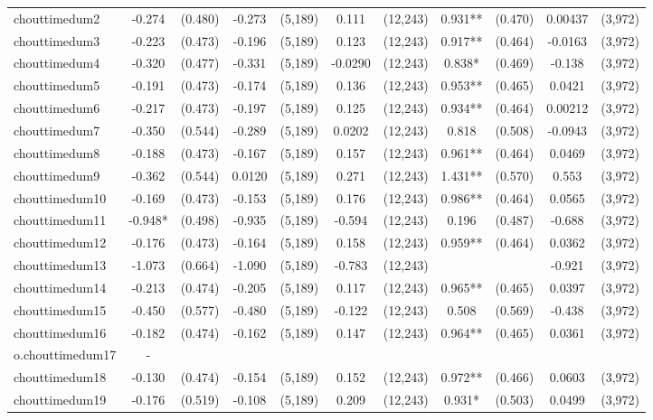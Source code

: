 \documentclass[]{article}
\begin{document}
\begin{tabular}{lcccccccccc}
chouttimedum2 & -0.274 & (0.480) & -0.273 & (5,189) & 0.111 & (12,243) & 0.931** & (0.470) & 0.00437 & (3,972) \\
chouttimedum3 & -0.223 & (0.473) & -0.196 & (5,189) & 0.123 & (12,243) & 0.917** & (0.464) & -0.0163 & (3,972) \\
chouttimedum4 & -0.320 & (0.477) & -0.331 & (5,189) & -0.0290 & (12,243) & 0.838* & (0.469) & -0.138 & (3,972) \\
chouttimedum5 & -0.191 & (0.473) & -0.174 & (5,189) & 0.136 & (12,243) & 0.953** & (0.465) & 0.0421 & (3,972) \\
chouttimedum6 & -0.217 & (0.473) & -0.197 & (5,189) & 0.125 & (12,243) & 0.934** & (0.464) & 0.00212 & (3,972) \\
chouttimedum7 & -0.350 & (0.544) & -0.289 & (5,189) & 0.0202 & (12,243) & 0.818 & (0.508) & -0.0943 & (3,972) \\
chouttimedum8 & -0.188 & (0.473) & -0.167 & (5,189) & 0.157 & (12,243) & 0.961** & (0.464) & 0.0469 & (3,972) \\
chouttimedum9 & -0.362 & (0.544) & 0.0120 & (5,189) & 0.271 & (12,243) & 1.431** & (0.570) & 0.553 & (3,972) \\
chouttimedum10 & -0.169 & (0.473) & -0.153 & (5,189) & 0.176 & (12,243) & 0.986** & (0.464) & 0.0565 & (3,972) \\
chouttimedum11 & -0.948* & (0.498) & -0.935 & (5,189) & -0.594 & (12,243) & 0.196 & (0.487) & -0.688 & (3,972) \\
chouttimedum12 & -0.176 & (0.473) & -0.164 & (5,189) & 0.158 & (12,243) & 0.959** & (0.464) & 0.0362 & (3,972) \\
chouttimedum13 & -1.073 & (0.664) & -1.090 & (5,189) & -0.783 & (12,243) &  &  & -0.921 & (3,972) \\
chouttimedum14 & -0.213 & (0.474) & -0.205 & (5,189) & 0.117 & (12,243) & 0.965** & (0.465) & 0.0397 & (3,972) \\
chouttimedum15 & -0.450 & (0.577) & -0.480 & (5,189) & -0.122 & (12,243) & 0.508 & (0.569) & -0.438 & (3,972) \\
chouttimedum16 & -0.182 & (0.474) & -0.162 & (5,189) & 0.147 & (12,243) & 0.964** & (0.465) & 0.0361 & (3,972) \\
o.chouttimedum17 & - &  &  &  &  &  &  &  &  &  \\
chouttimedum18 & -0.130 & (0.474) & -0.154 & (5,189) & 0.152 & (12,243) & 0.972** & (0.466) & 0.0603 & (3,972) \\
chouttimedum19 & -0.176 & (0.519) & -0.108 & (5,189) & 0.209 & (12,243) & 0.931* & (0.503) & 0.0499 & (3,972) \\

\end{tabular}
\end{document}
